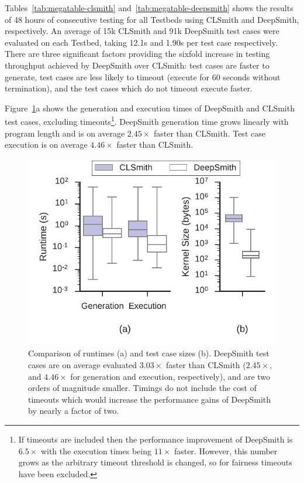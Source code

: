 Tables~\ref{tab:megatable-clsmith} and~\ref{tab:megatable-deepsmith} shows the results of 48 hours of consecutive testing for all Testbeds using CLSmith and DeepSmith, respectively. An average of 15k CLSmith and 91k DeepSmith test cases were evaluated on each Testbed, taking 12.1s and 1.90s per test case respectively. There are three significant factors providing the sixfold increase in testing throughput achieved by DeepSmith over CLSmith: test cases are faster to generate, test cases are less likely to timeout (execute for 60 seconds without termination), and the test cases which do not timeout execute faster.

Figure~\ref{fig:deepsmith-vs-clsmith}a shows the generation and execution times of DeepSmith and CLSmith test cases, excluding timeouts\footnote{If timeouts are included then the performance improvement of DeepSmith is $6.5\times$ with the execution times being $11\times$ faster. However, this number grows as the arbitrary timeout threshold is changed, so for fairness timeouts have been excluded.}. DeepSmith generation time grows linearly with program length and is on average $2.45\times$ faster than CLSmith. Test case execution is on average $4.46\times$ faster than CLSmith.

\begin{figure}
  \centering %
  \includegraphics[width=.72\columnwidth]{img/deepsmith-vs-clsmith}%
  \caption[Comparison of DeepSmith and CLSmith runtimes]{%
    Comparison of runtimes (a) and test case sizes (b). DeepSmith test cases are on average evaluated $3.03\times$ faster than CLSmith ($2.45\times$, and $4.46\times$ for generation and execution, respectively), and are two orders of magnitude smaller. Timings do not include the cost of timeouts which would increase the performance gains of DeepSmith by nearly a factor of two.%
  }%
  \label{fig:deepsmith-vs-clsmith}
\end{figure}

